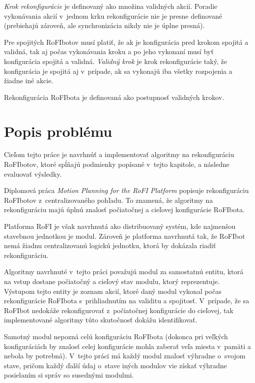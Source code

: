 \documentclass[
  printed, %
  oneside, %
  notable,   %
  nolof,     %
  nolot,     %
]{fithesis3}
\begin{document}

\textit{Krok rekonfigurácie} je definovaný ako množina validných akcií. Poradie vykonávania akcií v~jednom krku rekonfigurácie nie je presne definované (prebiehajú zároveň, ale synchronizácia nikdy nie je úplne presná). 

Pre spojitých RoFIbotov musí platiť, že ak je konfigurácia pred krokom spojitá a validná, tak aj počas vykonávania kroku a po jeho vykonaní musí byť konfigurácia spojitá a validná. \textit{Validný krok} je krok rekonfigurácie taký, že konfigurácia je spojitá aj v~prípade, ak sa vykonajú iba všetky rozpojenia a žiadne iné akcie. 

Rekonfigurácia RoFIbota je definovaná ako postupnosť validných krokov. 

\section{Popis problému}
\label{sec:problemDesc}
Cieľom tejto práce je navrhnúť a implementovať algoritmy na rekonfiguráciu RoFIbotov, ktoré spĺňajú podmienky popísané v~tejto kapitole, a následne evaluovať výsledky. 

Diplomová práca \textit{Motion Planning for the RoFI Platform} \cite{vozarovaMasterThesis} popisuje rekonfiguráciu RoFIbotov z~centralizovaného pohľadu. To znamená, že algoritmy na rekonfiguráciu majú úplnú znalosť počiatočnej a cieľovej konfigurácie RoFIbota. 

Platforma RoFI je však navrhnutá ako distribuovaný systém, kde najmenšou stavebnou jednotkou je modul. Zároveň je platforma navrhnutá tak, že RoFIbot nemá žiadnu centralizovanú logickú jednotku, ktorá by dokázala riadiť rekonfiguráciu. 

Algoritmy navrhnuté v~tejto práci považujú modul za samostatnú entitu, ktorá na vstup dostane počiatočný a cieľový stav modulu, ktorý reprezentuje. Výstupom tejto entity je zoznam akcií, ktoré daný modul vykonal počas rekonfigurácie RoFIbota s~prihliadnutím na validitu a spojitosť. V~prípade, že sa RoFIbot nedokáže rekonfigurovať z~počiatočnej konfigurácie do cieľovej, tak implementované algoritmy túto skutočnosť dokážu identifikovať. 

Samotný modul nepozná celú konfiguráciu RoFIbota (dokonca pri veľkých konfiguráciách by znalosť celej konfigurácie mohla zaberať veľa miesta v~pamäti a nebola by potrebná). V~tejto práci má každý modul znalosť výhradne o~svojom stave, pričom každý ďalší údaj o~stave iných modulov vie získať výhradne posielaním si správ so susednými modulmi. 
\end{document}
